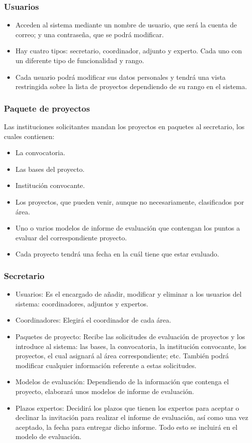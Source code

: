 \documentclass[12pt,a4paper,spanish,twoside]{article}
\begin{document}
\subsubsection{Usuarios}
\begin{itemize}
\item Acceden al sistema mediante un nombre de usuario, que será la cuenta de
  correo; y una contraseña, que se podrá modificar.
\item Hay cuatro tipos: secretario, coordinador, adjunto y experto. Cada uno
  con un diferente tipo de funcionalidad y rango. 
\item Cada usuario podrá modificar sus datos personales y tendrá una vista
  restringida sobre la lista de proyectos dependiendo de su rango en el sistema.
\end{itemize}

\subsubsection{Paquete de proyectos}
Las instituciones solicitantes mandan los proyectos en paquetes al
secretario, los cuales contienen: 
\begin{itemize}
\item La convocatoria.
\item Las bases del proyecto.
\item Institución convocante.
\item Los proyectos, que pueden venir, aunque no necesariamente, clasificados
  por área. 
\item Uno o varios modelos de informe de evaluación que contengan los puntos
  a evaluar del correspondiente proyecto. 
\item Cada proyecto tendrá una fecha en la cuál tiene que estar evaluado.
\end{itemize}

\subsubsection{Secretario}
\begin{itemize}
\item Usuarios: Es el encargado de añadir, modificar y eliminar a los
  usuarios del sistema: coordinadores, adjuntos y expertos.
\item Coordinadores: Elegirá el coordinador de cada área.
\item Paquetes de proyecto: Recibe las solicitudes de evaluación de proyectos
  y los introduce al sistema: las bases, la convocatoria, la institución
  convocante, los proyectos, el cual asignará al área correspondiente;
  etc. También podrá modificar cualquier información referente a estas
  solicitudes. 
\item Modelos de evaluación: Dependiendo de la información que contenga el
  proyecto, elaborará unos modelos de informe de evaluación. 
\item Plazos expertos: Decidirá los plazos que tienen los expertos para
  aceptar o declinar la invitación para realizar el informe de evaluación,
  así como una vez aceptado, la fecha para entregar dicho informe. Todo esto
  se incluirá en el modelo de evaluación.
\end{itemize}
\end{document}
